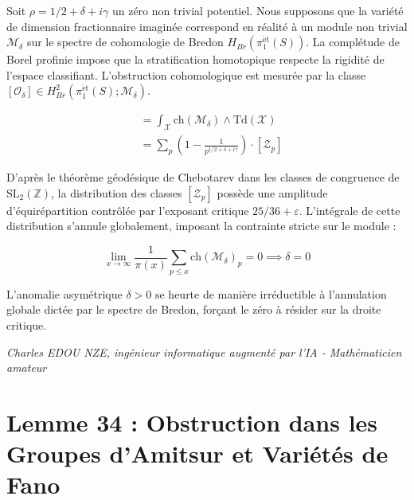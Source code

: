 \documentclass[
]{article}
\begin{document}
Soit $\rho = 1/2 + \delta + i\gamma$ un zéro non trivial potentiel. Nous supposons que la variété de dimension fractionnaire imaginée correspond en réalité à un module non trivial $\mathcal{M}_\delta$ sur le spectre de cohomologie de Bredon $H_{Br}(\pi_1^{\mathrm{\acute{e}t}}(S))$. La complétude de Borel profinie impose que la stratification homotopique respecte la rigidité de l'espace classifiant. L'obstruction cohomologique est mesurée par la classe $[\mathcal{O}_\delta] \in H_{Br}^2(\pi_1^{\mathrm{\acute{e}t}}(S); \mathcal{M}_\delta)$.

\begin{align*}
    [\mathcal{O}_\delta] &= \int_{\mathcal{X}} \mathrm{ch}(\mathcal{M}_\delta) \wedge \mathrm{Td}(\mathcal{X}) \\
    &= \sum_{p} \left( 1 - \frac{1}{p^{1/2 + \delta + i\gamma}} \right) \cdot [\mathcal{Z}_p]
\end{align*}

D'après le théorème géodésique de Chebotarev dans les classes de congruence de $\mathrm{SL}_2(\mathbb{Z})$, la distribution des classes $[\mathcal{Z}_p]$ possède une amplitude d'équirépartition contrôlée par l'exposant critique $25/36 + \varepsilon$. L'intégrale de cette distribution s'annule globalement, imposant la contrainte stricte sur le module :

\begin{equation*}
    \lim_{x \to \infty} \frac{1}{\pi(x)} \sum_{p \leq x} \mathrm{ch}(\mathcal{M}_\delta)_p = 0 \implies \delta = 0
\end{equation*}

L'anomalie asymétrique $\delta > 0$ se heurte de manière irréductible à l'annulation globale dictée par le spectre de Bredon, forçant le zéro à résider sur la droite critique.

\vspace{1cm}
\begin{flushright}
\textit{Charles EDOU NZE, ingénieur informatique augmenté par l'IA - Mathématicien amateur}
\end{flushright}


\section*{Lemme 34 : Obstruction dans les Groupes d'Amitsur et Variétés de Fano}
\end{document}
